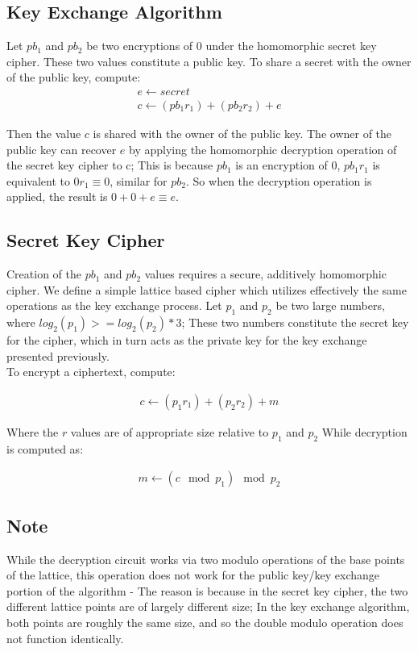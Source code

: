 \documentclass[preprint]{iacrtrans}
\begin{document}
\subsection{Key Exchange Algorithm}
Let $pb_1$ and $pb_2$ be two encryptions of $0$ under the homomorphic secret key cipher. These two values constitute a public key. To share a secret with the owner of the public key, compute:
\begin{align}
    e \gets secret \\
    c \gets (pb_1  r_1) + (pb_2 r_2) + e
\end{align}

Then the value $c$ is shared with the owner of the public key. The owner of the public key can recover $e$ by applying the homomorphic decryption operation of the secret key cipher to c; This is because $pb_1$ is an encryption of $0$, $pb_1 r_1$ is equivalent to $0 r_1 \equiv 0$, similar for $pb_2$. So when the decryption operation is applied, the result is $0 + 0 + e \equiv e$.

\subsection{Secret Key Cipher}
Creation of the $pb_1$ and $pb_2$ values requires a secure, additively homomorphic cipher. We define a simple lattice based cipher which utilizes effectively the same operations as the key exchange process. Let $p_1$ and $p_2$ be two large numbers, where $log_2(p_1) >= log_2(p_2) * 3$; These two numbers constitute the secret key for the cipher, which in turn acts as the private key for the key exchange presented previously.\\

To encrypt a ciphertext, compute:

\begin{align}
   c \gets (p_1 r_1) + (p_2 r_2) + m
\end{align}

Where the $r$ values are of appropriate size relative to $p_1$ and $p_2$ 
While decryption is computed as:

\begin{align}
    m \gets (c \mod p_1) \mod p_2
\end{align}

\subsection{Note}
While the decryption circuit works via two modulo operations of the base points of the lattice, this operation does not work for the public key/key exchange portion of the algorithm - The reason is because in the secret key cipher, the two different lattice points are of largely different size; In the key exchange algorithm, both points are roughly the same size, and so the double modulo operation does not function identically.
\end{document}
